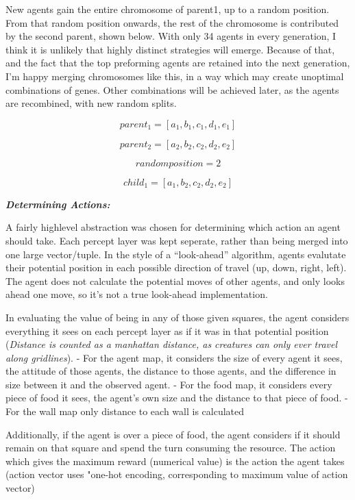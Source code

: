 \documentclass[
]{article}
\begin{document}
New agents gain the entire chromosome of parent1, up to a random
position. From that random position onwards, the rest of the chromosome
is contributed by the second parent, shown below. With only 34 agents in
every generation, I think it is unlikely that highly distinct strategies
will emerge. Because of that, and the fact that the top preforming
agents are retained into the next generation, I'm happy merging
chromosomes like this, in a way which may create unoptimal combinations
of genes. Other combinations will be achieved later, as the agents are
recombined, with new random splits.

\[parent_1 = [a_1, b_1, c_1, d_1, e_1]\]

\[parent_2 = [a_2, b_2, c_2, d_2, e_2]\]

\[ random position = 2\]

\[child_1 = [a_1, b_2, c_2, d_2, e_2]\]

\textbf{\emph{Determining Actions:}}

A fairly highlevel abstraction was chosen for determining which action
an agent should take. Each percept layer was kept seperate, rather than
being merged into one large vector/tuple. In the style of a
``look-ahead'' algorithm, agents evalutate their potential position in
each possible direction of travel (up, down, right, left). The agent
does not calculate the potential moves of other agents, and only looks
ahead one move, so it's not a true look-ahead implementation.

In evaluating the value of being in any of those given squares, the
agent considers everything it sees on each percept layer as if it was in
that potential position (\emph{Distance is counted as a manhattan
distance, as creatures can only ever travel along gridlines}). - For the
agent map, it considers the size of every agent it sees, the attitude of
those agents, the distance to those agents, and the difference in size
between it and the observed agent. - For the food map, it considers
every piece of food it sees, the agent's own size and the distance to
that piece of food. - For the wall map only distance to each wall is
calculated

Additionally, if the agent is over a piece of food, the agent considers
if it should remain on that square and spend the turn consuming the
resource. The action which gives the maximum reward (numerical value) is
the action the agent takes (action vector uses "one-hot encoding,
corresponding to maximum value of action vector)
\end{document}
